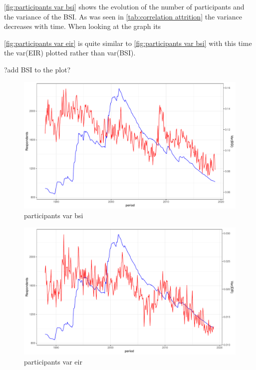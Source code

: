 \documentclass{article}[]
\begin{document}
\autoref{fig:participants var bsi} shows the evolution of the number of participants and the variance of the BSI. As was seen in \autoref{tab:correlation attrition} the variance decreases with time. When looking at the graph its

\autoref{fig:participants var eir} is quite similar to \autoref{fig:participants var bsi} with this time the var(EIR) plotted rather than var(BSI).


?add BSI to the plot?


\begin{figure}[htp!]
    \centering
    \includegraphics[scale=0.5]{Graphs/participants_var_bsi.pdf}
    \caption{participants var bsi}
    \label{fig:participants var bsi}
\end{figure}

\begin{figure}[H]
    \centering
    \includegraphics[scale=0.5]{Graphs/participants_var_eir.pdf}
    \caption{participants var eir}
    \label{fig:participants var eir}
\end{figure}
\end{document}
